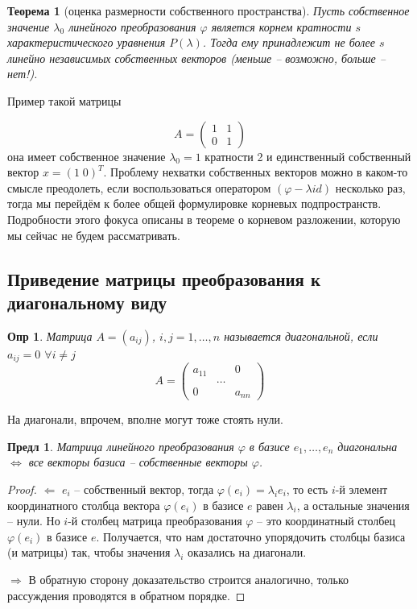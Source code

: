 \documentclass[a4paper,12pt]{article}
\newtheorem*{definition}{Опр}
\newtheorem{theorem}{Теорема}[section]
\newtheorem{propos}{Предл}[section]
\begin{document}
\begin{theorem}[оценка размерности собственного пространства]
	Пусть собственное значение $\lambda_0$ линейного преобразования $\varphi$ является корнем кратности $s$ характеристического уравнения $P(\lambda)$. Тогда ему принадлежит не более $s$ линейно независимых собственных векторов (меньше -- возможно, больше -- нет!).
\end{theorem}

Пример такой матрицы

\[
	A = \begin{pmatrix}
		1 & 1 \\
		0 & 1 
	\end{pmatrix}
\]
она имеет собственное значение $\lambda_0 = 1$ кратности 2 и единственный собственный вектор $x = (1 \; 0)^T$. Проблему нехватки собственных векторов можно в каком-то смысле преодолеть, если воспользоваться оператором $(\varphi - \lambda id)$ несколько раз, тогда мы перейдём к более общей формулировке корневых подпространств. Подробности этого фокуса описаны в теореме о корневом разложении, которую мы сейчас не будем рассматривать.

\subsection{Приведение матрицы преобразования к диагональному виду}
\begin{definition}
Матрица $A = (a_{ij})$, $i,j = 1,\ldots,n$ называется диагональной, если $a_{ij} = 0$ $\forall i \ne j$
\[
	A = \begin{pmatrix}
		a_{11} & 	    & 0 \\
		       & \ldots &   \\
		0      &        & a_{nn}
	\end{pmatrix}
\]
\end{definition}

На диагонали, впрочем, вполне могут тоже стоять нули.

\begin{propos}
	Матрица линейного преобразования $\varphi$ в базисе $e_1, \ldots, e_n$ диагональна $\Leftrightarrow$ все векторы базиса -- собственные векторы $\varphi$.
\end{propos}
\begin{proof}
	$\Leftarrow$ $e_i$ -- собственный вектор, тогда $\varphi(e_i) = \lambda_i e_i$, то есть $i$-й элемент координатного столбца вектора $\varphi(e_i)$ в базисе $e$ равен $\lambda_i$, а остальные значения -- нули. Но $i$-й столбец матрица преобразования $\varphi$ -- это координатный столбец $\varphi(e_i)$ в базисе $e$. Получается, что нам достаточно упорядочить столбцы базиса (и матрицы) так, чтобы значения $\lambda_i$ оказались на диагонали.
	
	$\Rightarrow$ В обратную сторону доказательство строится аналогично, только рассуждения проводятся в обратном порядке.
\end{proof}
\end{document}
